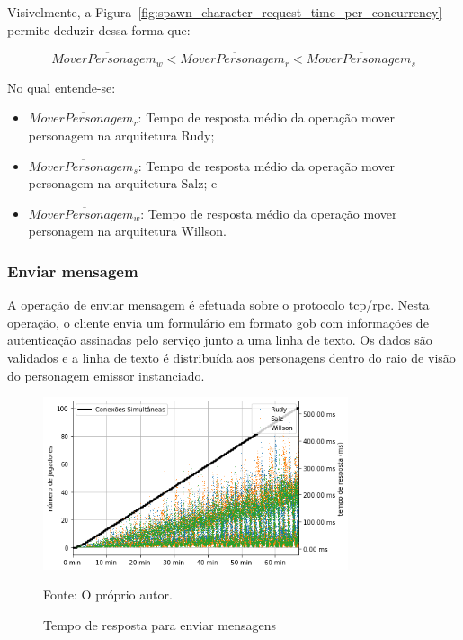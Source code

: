 Visivelmente, a Figura~\ref{fig:spawn_character_request_time_per_concurrency} permite deduzir dessa forma que:

$$
  \overline{MoverPersonagem_{w}} < \overline{MoverPersonagem_{r}} <\overline{MoverPersonagem_{s}}
$$

No qual entende-se:

\begin{itemize}
 \item $\overline{MoverPersonagem_{r}}$: Tempo de resposta médio da operação mover personagem na arquitetura Rudy;
 \item $\overline{MoverPersonagem_{s}}$: Tempo de resposta médio da operação mover personagem na arquitetura Salz; e
 \item $\overline{MoverPersonagem_{w}}$: Tempo de resposta médio da operação mover personagem na arquitetura Willson.
\end{itemize}


\subsubsection{Enviar mensagem}

A operação de enviar mensagem é efetuada sobre o protocolo \ac{tcp}/\ac{rpc}.
%
Nesta operação, o cliente envia um formulário em formato \ac{gob} com informações de autenticação assinadas pelo serviço junto a uma linha de texto.
%
Os dados são validados e a linha de texto é distribuída aos personagens dentro do raio de visão do personagem emissor instanciado.

\begin{figure}[htb!]
  \caption{Tempo de resposta para enviar mensagens}
  \label{fig:send_chat_request_time}
  \includegraphics[width=0.8\textwidth]{figuras/analise/rt/send_chat_request_time}
  \centering

  Fonte: O próprio autor.
\end{figure}

